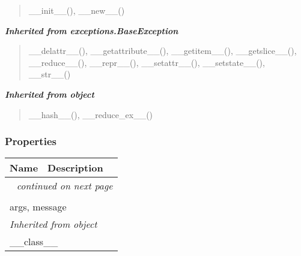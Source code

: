 \begin{quote}
\_\_init\_\_(), \_\_new\_\_()
\end{quote}

\large{\textbf{\textit{Inherited from exceptions.BaseException}}}

\begin{quote}
\_\_delattr\_\_(), \_\_getattribute\_\_(), \_\_getitem\_\_(), \_\_getslice\_\_(), \_\_reduce\_\_(), \_\_repr\_\_(), \_\_setattr\_\_(), \_\_setstate\_\_(), \_\_str\_\_()
\end{quote}

\large{\textbf{\textit{Inherited from object}}}

\begin{quote}
\_\_hash\_\_(), \_\_reduce\_ex\_\_()
\end{quote}


  \subsubsection{Properties}

    \vspace{-1cm}
\hspace{\varindent}\begin{longtable}{|p{\varnamewidth}|p{\vardescrwidth}|l}
\cline{1-2}
\cline{1-2} \centering \textbf{Name} & \centering \textbf{Description}& \\
\cline{1-2}
\endhead\cline{1-2}\multicolumn{3}{r}{\small\textit{continued on next page}}\\\endfoot\cline{1-2}
\endlastfoot\multicolumn{2}{|l|}{\textit{Inherited from exceptions.BaseException}}\\
\multicolumn{2}{|p{\varwidth}|}{\raggedright args, message}\\
\cline{1-2}
\multicolumn{2}{|l|}{\textit{Inherited from object}}\\
\multicolumn{2}{|p{\varwidth}|}{\raggedright \_\_class\_\_}\\
\cline{1-2}
\end{longtable}



